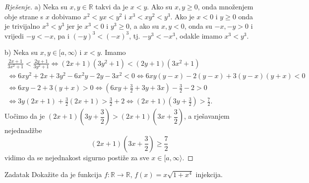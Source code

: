 \begin{proof}[Rješenje]
a) Neka su $x, y\in \mathbb{R}$ takvi da je $x<y$. Ako su $x, y\geq 0$, onda množenjem obje strane s $x$ dobivamo $x^2<yx<y^2$ i $x^3<xy^2<y^3$. Ako je $x<0$ i $y\geq 0$ onda je trivijalno $x^3<y^3$ jer je $x^3<0$ i $y^3\geq 0$, a ako su $x, y<0$, onda su $-x, -y>0$ i vrijedi $-y<-x$, pa i $(-y)^3<(-x)^3$, tj. $-y^3<-x^3$, odakle imamo $x^3<y^3$.

b) Neka su $x, y\in [a, \infty\rangle$ i $x<y$. Imamo
\begin{gather*}
\frac{2x+1}{3x^{2}+1}<\frac{2y+1}{3y^{2}+1}\Leftrightarrow \left(2x+1\right)\left(3y^{2}+1\right)<\left(2y+1\right)\left(3x^{2}+1\right)\\\Leftrightarrow 6xy^{2}+2x+3y^{2}-6x^{2}y-2y-3x^{2}<0
\Leftrightarrow 6xy\left(y-x\right)-2\left(y-x\right)+3\left(y-x\right)\left(y+x\right)<0\\ \Leftrightarrow 6xy-2+3\left(y+x\right)>0\Leftrightarrow
\left(6xy+\frac{3}{2}+3y+3x\right)-\frac{3}{2}-2>0 \\
\Leftrightarrow 3y\left(2x+1\right)+\frac{3}{2}\left(2x+1\right)>\frac{3}{2}+2
\Leftrightarrow \left(2x+1\right)\left(3y+\frac{3}{2}\right)>\frac{7}{2}.
\end{gather*}
Uočimo da je $\left(2x+1\right)\left(3y+\dfrac{3}{2}\right)>\left(2x+1\right)\left(3x+\dfrac{3}{2}\right)$, a rješavanjem nejednadžbe $$\left(2x+1\right)\left(3x+\dfrac{3}{2}\right)\geq \dfrac{7}{2}$$ vidimo da se nejednakost sigurno postiže za sve $x\in [a, \infty\rangle$.
\end{proof}
\begin{exercise}{Zadatak}
Dokažite da je funkcija \(f : \mathbb{R}\to \mathbb{R}\), \(f(x)=x\sqrt{1+x^4}\) injekcija.
\end{exercise}
